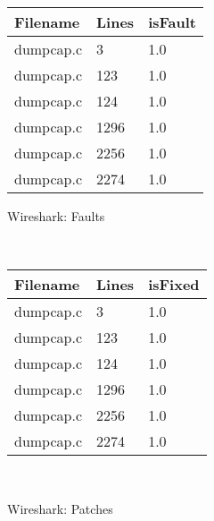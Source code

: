 \begin{figure}
  \begin{minipage}{\linewidth}
    \centering
    \begin{tabular}{l|l|l}
      Filename  & Lines & isFault \\ \hline
      dumpcap.c & 3           & 1.0     \\ \hline
      dumpcap.c & 123         & 1.0     \\ \hline
      dumpcap.c & 124         & 1.0     \\ \hline
      dumpcap.c & 1296        & 1.0     \\ \hline
      dumpcap.c & 2256        & 1.0     \\ \hline
      dumpcap.c & 2274        & 1.0    
    \end{tabular}
    \caption{Wireshark: Faults}
  \end{minipage} \\
  
  
    \begin{minipage}{\linewidth}
      \centering
      \begin{tabular}{l|l|l}
        Filename  & Lines & isFixed \\ \hline
        dumpcap.c & 3           & 1.0     \\ \hline
        dumpcap.c & 123         & 1.0     \\ \hline
        dumpcap.c & 124         & 1.0     \\ \hline
        dumpcap.c & 1296        & 1.0     \\ \hline
        dumpcap.c & 2256        & 1.0     \\ \hline
        dumpcap.c & 2274        & 1.0    
      \end{tabular}
      \caption{Wireshark: Patches}
    \end{minipage} \\
    
  \centering

\label{fig:fixedfiles}
\end{figure}
